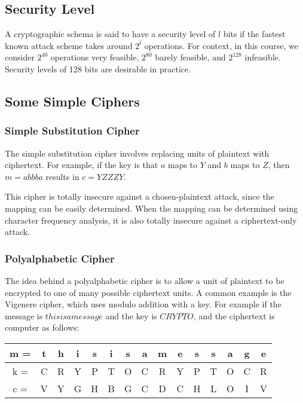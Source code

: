 \documentclass[12pt,titlepage]{article}
\begin{document}
    \subsection{Security Level}
      A cryptographic schema is said to have a security level of $l$ bits if the fastest known attack scheme takes around $2^l$ operations.
      For context, in this course, we consider $2^{40}$ operations very feasible, $2^{80}$ barely feasible, and $2^{128}$ infeasible.
      Security levels of 128 bits are desirable in practice.

    \subsection{Some Simple Ciphers}

      \subsubsection{Simple Substitution Cipher}
        The simple substitution cipher involves replacing units of plaintext with ciphertext. For example, if the key is that $a$ maps to $Y$
        and $b$ maps to $Z$, then $m = abbba$ results in $c = YZZZY$.

        This cipher is totally insecure against a chosen-plaintext attack, since the mapping can be easily determined. When the mapping can be
        determined using character frequency analysis, it is also totally insecure against a ciphertext-only attack.

      \subsubsection{Polyalphabetic Cipher}
        The idea behind a polyalphabetic cipher is to allow a unit of plaintext to be encrypted to one of many possible ciphertext units. A
        common example is the Vigenere cipher, which uses modulo addition with a key. For example if the message is $thisisamessage$ and the
        key is $CRYPTO$, and the ciphertext is computer as follows:

        \begin{table}[H]
          \centering
          \begin{tabular}{ | c | c c c c c c c c c c c c c c | }
            \hline
            m = & t & h & i & s & i & s & a & m & e & s & s & a & g & e \\
            \hline
            k = & C & R & Y & P & T & O & C & R & Y & P & T & O & C & R \\
            \hline
            c = & V & Y & G & H & B & G & C & D & C & H & L & O & I & V \\
            \hline
          \end{tabular}
        \end{table}
\end{document}

